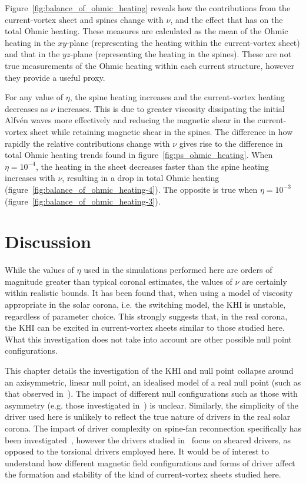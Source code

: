 Figure~\ref{fig:balance_of_ohmic_heating} reveals how the contributions from the current-vortex sheet and spines change with $\nu$, and the effect that has on the total Ohmic heating. These measures are calculated as the mean of the Ohmic heating in the $xy$-plane (representing the heating within the current-vortex sheet) and that in the $yz$-plane (representing the heating in the spines). These are not true measurements of the Ohmic heating within each current structure, however they provide a useful proxy. 

For any value of $\eta$, the spine heating increases and the current-vortex heating decreases as $\nu$ increases. This is due to greater viscosity dissipating the initial Alfv\'en waves more effectively and reducing the magnetic shear in the current-vortex sheet while retaining magnetic shear in the spines. The difference in how rapidly the relative contributions change with $\nu$ gives rise to the difference in total Ohmic heating trends found in figure~\ref{fig:ps_ohmic_heating}. When $\eta=10^{-4}$, the heating in the sheet decreases faster than the spine heating increases with $\nu$, resulting in a drop in total Ohmic heating (figure~\ref{fig:balance_of_ohmic_heating-4}). The opposite is true when $\eta=10^{-3}$ (figure~\ref{fig:balance_of_ohmic_heating-3}).

\section{Discussion}
\label{sec:khi_discussion}

While the values of $\eta$ used in the simulations performed here are orders of magnitude greater than typical coronal estimates, the values of $\nu$ are certainly within realistic bounds. It has been found that, when using a model of viscosity appropriate in the solar corona, i.e. the switching model, the KHI is unstable, regardless of parameter choice. This strongly suggests that, in the real corona, the KHI can be excited in current-vortex sheets similar to those studied here. What this investigation does not take into account are other possible null point configurations.

This chapter details the investigation of the KHI and null point collapse around an axisymmetric, linear null point, an idealised model of a real null point (such as that observed in~\cite{massonNATUREFLARERIBBONS2009}). The impact of different null configurations such as those with asymmetry (e.g. those investigated in~\cite{thurgoodImplosiveCollapseMagnetic2018,pontinWhyAreFlare2016a}) is unclear. Similarly, the simplicity of the driver used here is unlikely to reflect the true nature of drivers in the real solar corona. The impact of driver complexity on spine-fan reconnection specifically has been investigated~\cite{wyperSpinefanReconnectionInfluence2012}, however the drivers studied in~\cite{wyperSpinefanReconnectionInfluence2012} focus on sheared drivers, as opposed to the torsional drivers employed here. It would be of interest to understand how different magnetic field configurations and forms of driver affect the formation and stability of the kind of current-vortex sheets studied here.

